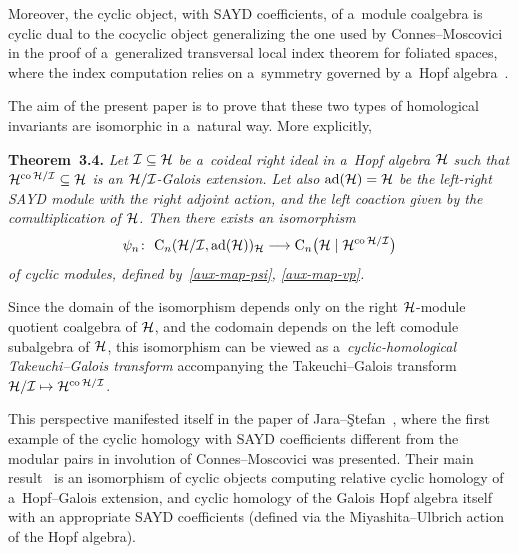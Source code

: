 \documentclass[pdftex]{sigma}
\numberwithin{equation}{section}
\DeclareMathOperator{\ad}{ad}
\DeclareMathOperator{\co}{co}
\begin{document}
Moreover, the cyclic object, with SAYD coef\/f\/icients, of a~module coalgebra is cyclic dual to the cocyclic object
generalizing the one used by Connes--Moscovici in the proof of a~gene\-ra\-li\-zed transversal local index theorem for
foliated spaces, where the index computation relies on a~symmetry governed by a~Hopf
algebra~\cite{ConnMosc98,ConnMosc99,HajaKhalRangSomm04-II}.

The aim of the present paper is to prove that these two types of homological invariants are isomorphic in a~natural way.
More explicitly,

\smallskip

\noindent\textbf{Theorem~3.4.} \emph{Let ${\cal I}\subseteq {\cal H}$ be a~coideal right ideal in a~Hopf algebra ${\cal H}$
such that ${\cal H}^{\co{\cal H}/{\cal I}}\subseteq {\cal H}$ is an ${\cal H}/{\cal I}$-Galois extension.
Let also $\ad({\cal H})={\cal H}$ be the left-right SAYD module with the right adjoint action, and the left
coaction given by the comultiplication of ${\cal H}$.
Then there exists an isomorphism
\begin{gather*}
\psi_{n}\colon \
 {\rm C}_{n}({\cal H}/{\cal I},\ad({\cal H}))_{{\cal H}}\longrightarrow {\rm C}_{n}\big({\cal H}\mid{\cal H}^{\co{\cal H}/{\cal I}}\big)
\end{gather*}
of cyclic modules, defined by~\eqref{aux-map-psi}, \eqref{aux-map-vp}.}

\smallskip

Since the domain of the isomorphism depends only on the right ${\cal H}$-module quotient coalgebra of ${\cal H}$, and
the codomain depends on the left comodule subalgebra of ${\cal H}$, this isomorphism can be viewed as
a~\emph{cyclic-homological Takeuchi--Galois transform} accompanying the Takeuchi--Galois
transform ${\cal H}/{\cal I}\mapsto {\cal H}^{\co{\cal H}/{\cal I}}$.

This perspective manifested itself in the paper of Jara--\c{S}tefan~\cite{JaraStef06}, where the f\/irst example of the
cyclic homology with SAYD coef\/f\/icients dif\/ferent from the modular pairs in involution of Connes--Moscovici was presented.
Their main result~\cite[Theorem~3.7]{JaraStef06} is an isomorphism of cyclic objects computing relative cyclic homology
of a~Hopf--Galois extension, and cyclic homology of the Galois Hopf algebra itself with an appropriate SAYD coef\/f\/icients
(def\/ined via the Miyashita--Ulbrich action of the Hopf algebra).
\end{document}
